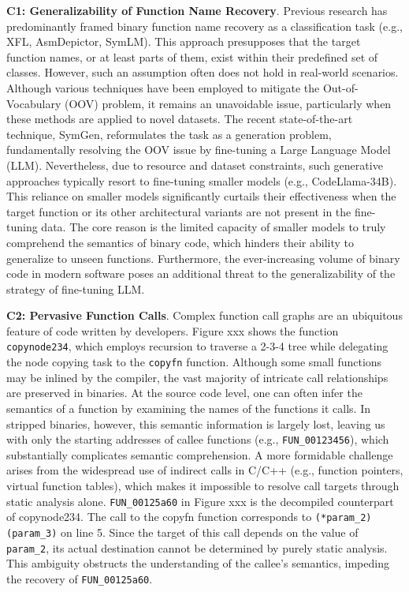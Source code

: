 \documentclass[acmsmall,screen,review,anonymous]{acmart} %
\begin{document}
\textbf{C1: Generalizability of Function Name Recovery}. Previous research has predominantly framed binary function name recovery as a classification task (e.g., XFL, AsmDepictor, SymLM). This approach presupposes that the target function names, or at least parts of them, exist within their predefined set of classes. However, such an assumption often does not hold in real-world scenarios. Although various techniques have been employed to mitigate the Out-of-Vocabulary (OOV) problem, it remains an unavoidable issue, particularly when these methods are applied to novel datasets. The recent state-of-the-art technique, SymGen, reformulates the task as a generation problem, fundamentally resolving the OOV issue by fine-tuning a Large Language Model (LLM). Nevertheless, due to resource and dataset constraints, such generative approaches typically resort to fine-tuning smaller models (e.g., CodeLlama-34B). This reliance on smaller models significantly curtails their effectiveness when the target function or its other architectural variants are not present in the fine-tuning data. The core reason is the limited capacity of smaller models to truly comprehend the semantics of binary code, which hinders their ability to generalize to unseen functions. Furthermore, the ever-increasing volume of binary code in modern software poses an additional threat to the generalizability of the strategy of fine-tuning LLM.

\textbf{C2: Pervasive Function Calls}. Complex function call graphs are an ubiquitous feature of code written by developers. Figure xxx shows the function \lstinline{copynode234}, which employs recursion to traverse a 2-3-4 tree while delegating the node copying task to the \lstinline{copyfn} function. Although some small functions may be inlined by the compiler, the vast majority of intricate call relationships are preserved in binaries. At the source code level, one can often infer the semantics of a function by examining the names of the functions it calls. In stripped binaries, however, this semantic information is largely lost, leaving us with only the starting addresses of callee functions (e.g., \lstinline{FUN_00123456}), which substantially complicates semantic comprehension. A more formidable challenge arises from the widespread use of indirect calls in C/C++ (e.g., function pointers, virtual function tables), which makes it impossible to resolve call targets through static analysis alone. \lstinline{FUN_00125a60} in Figure xxx is the decompiled counterpart of copynode234. The call to the copyfn function corresponds to \lstinline{(*param_2)(param_3)} on line 5. Since the target of this call depends on the value of \lstinline{param_2}, its actual destination cannot be determined by purely static analysis. This ambiguity obstructs the understanding of the callee's semantics, impeding the recovery of \lstinline{FUN_00125a60}.
\end{document}

